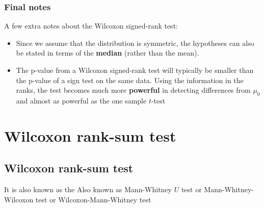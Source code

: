 \documentclass[a4paper]{article}\usepackage[]{graphicx}\usepackage[]{xcolor}
\begin{document}
\subsubsection{Final notes}
A few extra notes about the Wilcoxon signed-rank test:
\begin{itemize}
	\item Since we assume that the distribution is symmetric, the hypotheses can also be stated in terms of the \textcolor{myred}{\textbf{median}} (rather than the mean).
	\item The p-value from a Wilcoxon signed-rank test will typically be smaller than the p-value of a sign test on the same data. Using the information in the ranks, the test becomes much more \textcolor{mygreen}{\textbf{powerful}} in detecting differences from \( \mu_0 \) and almost as powerful as the one sample \( t \)-test
\end{itemize}
\section{Wilcoxon rank-sum test}\label{sec:15}
\subsection{Wilcoxon rank-sum test}
It is also known as the Also known as Mann-Whitney \( U \) test or Mann-Whitney-Wilcoxon test or Wilcoxon-Mann-Whitney test
\end{document}
